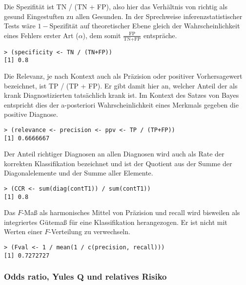 Die Spezifität ist TN / (TN + FP), also hier das Verhältnis von richtig als gesund Eingestuften zu allen Gesunden. In der Sprechweise inferenzstatistischer Tests wäre $1 - \text{Spezifität}$ auf theoretischer Ebene gleich der Wahrscheinlichkeit eines Fehlers erster Art ($\alpha$), dem somit $\frac{\text{FP}}{\text{TN} + \text{FP}}$ entspräche.
\begin{lstlisting}
> (specificity <- TN / (TN+FP))
[1] 0.8
\end{lstlisting}

Die Relevanz, je nach Kontext auch als Präzision oder positiver Vorhersagewert bezeichnet, ist TP / (TP + FP). Er gibt damit hier an, welcher Anteil der als krank Diagnostizierten tatsächlich krank ist. Im Kontext des Satzes von Bayes entspricht dies der a-posteriori Wahrscheinlichkeit eines Merkmals gegeben die positive Diagnose.
\begin{lstlisting}
> (relevance <- precision <- ppv <- TP / (TP+FP))
[1] 0.6666667
\end{lstlisting}

Der Anteil richtiger Diagnosen an allen Diagnosen wird auch als Rate der korrekten Klassifikation bezeichnet und ist der Quotient aus der Summe der Diagonalelemente und der Summe aller Elemente.
\begin{lstlisting}
> (CCR <- sum(diag(contT1)) / sum(contT1))
[1] 0.8
\end{lstlisting}

Das $F$-Maß als harmonisches Mittel von Präzision und recall wird bisweilen als integriertes Gütemaß für eine Klassifikation herangezogen. Er ist nicht mit Werten einer $F$-Verteilung zu verwechseln.
\begin{lstlisting}
> (Fval <- 1 / mean(1 / c(precision, recall)))
[1] 0.7272727
\end{lstlisting}

\subsubsection{Odds ratio, Yules $\bm{Q}$ und relatives Risiko}

